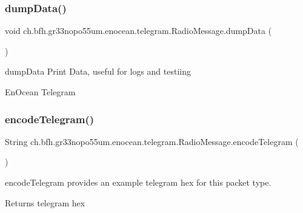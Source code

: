 \subsubsection{\texorpdfstring{dump\+Data()}{dumpData()}}
{\footnotesize\ttfamily void ch.\+bfh.\+gr33nopo55um.\+enocean.\+telegram.\+Radio\+Message.\+dump\+Data (\begin{DoxyParamCaption}{ }\end{DoxyParamCaption})}

dump\+Data Print Data, useful for logs and testiing 

En\+Ocean Telegram \hypertarget{classch_1_1bfh_1_1gr33nopo55um_1_1enocean_1_1telegram_1_1_radio_message_ac1d3f61c4242953828f132de6c7595f3}{}\label{classch_1_1bfh_1_1gr33nopo55um_1_1enocean_1_1telegram_1_1_radio_message_ac1d3f61c4242953828f132de6c7595f3} 
\subsubsection{\texorpdfstring{encode\+Telegram()}{encodeTelegram()}}
{\footnotesize\ttfamily String ch.\+bfh.\+gr33nopo55um.\+enocean.\+telegram.\+Radio\+Message.\+encode\+Telegram (\begin{DoxyParamCaption}{ }\end{DoxyParamCaption})}

encode\+Telegram provides an example telegram hex for this packet type.

\begin{DoxyReturn}{Returns}
telegram hex 
\end{DoxyReturn}
\hypertarget{classch_1_1bfh_1_1gr33nopo55um_1_1enocean_1_1telegram_1_1_radio_message_af0c883d403a7500296a6f2e8f720308d}{}\label{classch_1_1bfh_1_1gr33nopo55um_1_1enocean_1_1telegram_1_1_radio_message_af0c883d403a7500296a6f2e8f720308d} 

